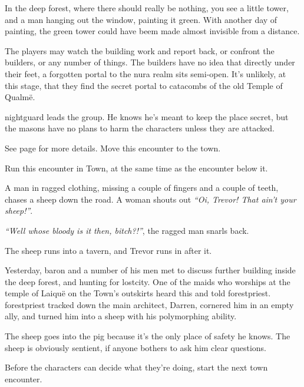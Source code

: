 \begin{multicols}{2}
\begin{boxtext}

	In the deep forest, where there should really be nothing, you see a little tower, and a man hanging out the window, painting it green.
	With another day of painting, the green tower could have beem made almost invisible from a distance.

\end{boxtext}

The players may watch the building work and report back, or confront the builders, or any number of things.
The builders have no idea that directly under their feet, a forgotten portal to the nura realm sits semi-open.
It's unlikely, at this stage, that they find the secret portal to catacombs of the old Temple of Qualm\"{e}.

\Gls{nightguard} leads the group.
He knows he's meant to keep the place secret, but the masons have no plans to harm the characters unless they are attacked.

See page \pageref{green_tower} for more details.  Move this encounter to the town.


Run this encounter in Town, at the same time as the encounter below it.

\begin{boxtext}
	A man in ragged clothing, missing a couple of fingers and a couple of teeth, chases a sheep down the road.  A woman shouts out \emph{``Oi, Trevor! That ain't your sheep!''}.

	\emph{``Well whose bloody is it then, bitch?!''}, the ragged man snarls back.

	The sheep runs into a tavern, and Trevor runs in after it.
\end{boxtext}

Yesterday, \gls{baron} and a number of his men met to discuss further building inside the deep forest, and hunting for \gls{lostcity}.
One of the maids who worships at the temple of Laiqu\"{e} on the Town's outskirts heard this and told \gls{forestpriest}.
\Gls{forestpriest} tracked down the main architect, Darren, cornered him in an empty ally, and turned him into a sheep with his polymorphing ability.

The sheep goes into the \gls{pig} because it's the only place of safety he knows.  The sheep is obviously sentient, if anyone bothers to ask him clear questions.

Before the characters can decide what they're doing, start the next town encounter.


\end{multicols}
